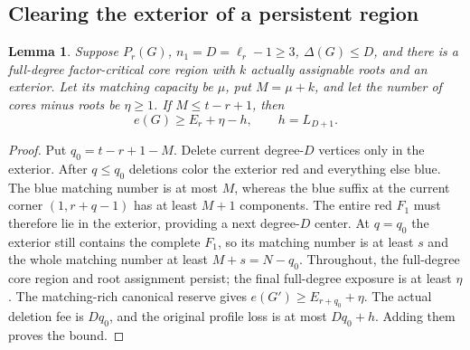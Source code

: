 \documentclass[11pt,a4paper]{article}
\newtheorem{lemma}[theorem]{Lemma}
\theoremstyle{definition}
\begin{document}
\subsection{Clearing the exterior of a persistent region}
\begin{lemma}\label{lem:persistent-region}
Suppose $P_r(G)$, $n_1=D=\ell_r-1\ge3$, $\Delta(G)\le D$, and there is a full-degree factor-critical core region with $k$ actually assignable roots and an exterior. Let its matching capacity be $\mu$, put $M=\mu+k$, and let the number of cores minus roots be $\eta\ge1$. If $M\le t-r+1$, then
\[
 e(G)\ge E_r+\eta-h,\qquad h=L_{D+1}.
\]
\end{lemma}
\begin{proof}
Put $q_0=t-r+1-M$. Delete current degree-$D$ vertices only in the exterior. After $q\le q_0$ deletions color the exterior red and everything else blue. The blue matching number is at most $M$, whereas the blue suffix at the current corner $(1,r+q-1)$ has at least $M+1$ components. The entire red $F_1$ must therefore lie in the exterior, providing a next degree-$D$ center. At $q=q_0$ the exterior still contains the complete $F_1$, so its matching number is at least $s$ and the whole matching number at least $M+s=N-q_0$. Throughout, the full-degree core region and root assignment persist; the final full-degree exposure is at least $\eta$. The matching-rich canonical reserve gives $e(G')\ge E_{r+q_0}+\eta$. The actual deletion fee is $Dq_0$, and the original profile loss is at most $Dq_0+h$. Adding them proves the bound.
\end{proof}
\end{document}
